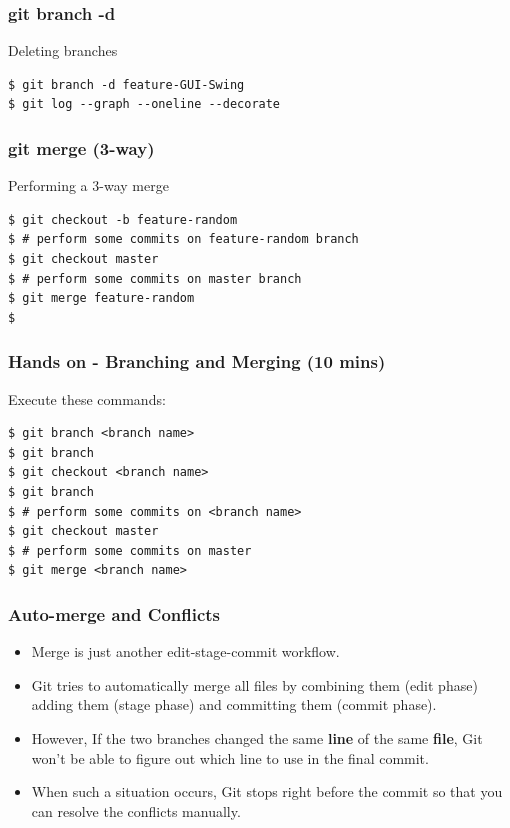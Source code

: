 \documentclass{beamer}
\begin{document}
\begin{frame}[fragile]
\frametitle{git branch -d}

Deleting branches

\begin{lstlisting}
$ git branch -d feature-GUI-Swing
$ git log --graph --oneline --decorate
\end{lstlisting}
\end{frame}


\begin{frame}[fragile]
\frametitle{git merge (3-way)}

Performing a 3-way merge

\begin{lstlisting}
$ git checkout -b feature-random
$ # perform some commits on feature-random branch
$ git checkout master
$ # perform some commits on master branch
$ git merge feature-random
$ 
\end{lstlisting}
\end{frame}



\begin{frame}[fragile]
\frametitle{Hands on - Branching and Merging (10 mins)}

Execute these commands:

\begin{lstlisting}
$ git branch <branch name>
$ git branch
$ git checkout <branch name>
$ git branch
$ # perform some commits on <branch name>
$ git checkout master
$ # perform some commits on master
$ git merge <branch name>
\end{lstlisting}
\end{frame}

\begin{frame}
\frametitle{Auto-merge and Conflicts}

\begin{itemize}

\item Merge is just another edit-stage-commit workflow.

\item Git tries to automatically merge all files by combining them (edit
phase) adding them (stage phase) and committing them (commit phase).

\item However, If the two branches changed the same \textbf{line}
of the same \textbf{file}, Git won't be able to figure out which
line to use in the final commit. 

\item When such a situation occurs, Git stops right before the commit so that
you can resolve the conflicts manually.

\end{itemize}

\end{frame}
\end{document}
